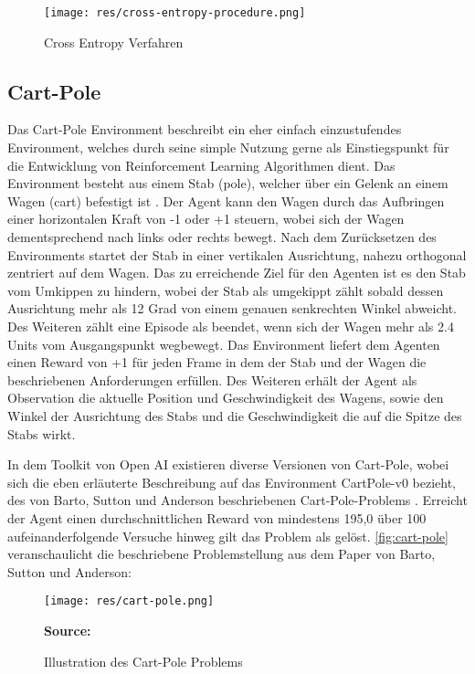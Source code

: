 \documentclass[11pt]{scrartcl}
\newcommand{\source}[1]{\vspace{-5pt} \caption*{\hfill \textbf{Source:} {#1}} }
\begin{document}
\begin{figure}[htp]
\centering
\texttt{[image: res/cross-entropy-procedure.png]}
\caption{Cross Entropy Verfahren}
\label{fig:cross_entropy_procedure}
\end{figure}

\subsection{Cart-Pole}
Das Cart-Pole Environment beschreibt ein eher einfach einzustufendes Environment, welches durch seine
simple Nutzung gerne als Einstiegspunkt für die Entwicklung von Reinforcement Learning Algorithmen 
dient. Das Environment besteht aus einem Stab (pole), welcher über ein Gelenk an einem Wagen (cart) 
befestigt ist \cite{OAI2016_2}. Der Agent kann den Wagen durch das Aufbringen einer horizontalen Kraft 
von -1 oder +1 steuern, wobei sich der Wagen dementsprechend nach links oder rechts bewegt. Nach 
dem Zurücksetzen des Environments startet der Stab in einer vertikalen Ausrichtung, nahezu orthogonal
zentriert auf dem Wagen. Das zu erreichende Ziel für den Agenten ist es den Stab vom Umkippen zu hindern,
wobei der Stab als umgekippt zählt sobald dessen Ausrichtung mehr als 12 Grad von einem genauen
senkrechten Winkel abweicht. Des Weiteren zählt eine Episode als beendet, wenn sich der Wagen mehr
als 2.4 Units vom Ausgangspunkt wegbewegt. Das Environment liefert dem Agenten einen Reward von +1
für jeden Frame in dem der Stab und der Wagen die beschriebenen Anforderungen erfüllen. Des Weiteren
erhält der Agent als Observation die aktuelle Position und Geschwindigkeit des Wagens, sowie den Winkel
der Ausrichtung des Stabs und die Geschwindigkeit die auf die Spitze des Stabs wirkt.

In dem Toolkit von Open AI existieren diverse Versionen von Cart-Pole, wobei sich die eben
erläuterte Beschreibung auf das Environment CartPole-v0 bezieht, des von Barto, Sutton und
Anderson beschriebenen Cart-Pole-Problems \cite[~S.838 f.]{BSA1983}. Erreicht der Agent einen
durchschnittlichen Reward von mindestens 195,0 über 100 aufeinanderfolgende Versuche hinweg gilt das
Problem als gelöst. \autoref{fig:cart-pole} veranschaulicht die beschriebene Problemstellung aus dem 
Paper\cite{BSA1983} von Barto, Sutton und Anderson:

\begin{figure}[htp]
\centering
\texttt{[image: res/cart-pole.png]}
\caption{Illustration des Cart-Pole Problems}
\source{\cite[~S.838]{BSA1983}}
\label{fig:cart-pole}
\end{figure}
\end{document}
